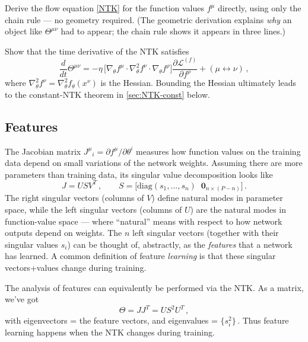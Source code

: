 \documentclass[11pt]{article}
\newcommand{\CL}{{\mathcal L}}
\newcommand{\pd}{\partial}
\begin{document}
\begin{exercise}
\label{ex:ntk-direct}
Derive the flow equation \eqref{NTK} for the function values $f^\mu$ directly, using only the chain rule --- no geometry required. (The geometric derivation explains \emph{why} an object like $\Theta^{\mu\nu}$ had to appear; the chain rule shows it appears in three lines.)
\end{exercise}

\begin{exercise}
\label{ex:ntk-dot}
Show that the time derivative of the NTK satisfies
%
\begin{equation}
    \frac{d}{dt} \Theta^{\mu\nu} = -\eta\,\big[ \nabla_\theta f^\mu \cdot \nabla_\theta^2 f^\nu \cdot \nabla_\theta f^\rho\big] \frac{\partial \CL^{(f)}}{\partial f^\rho} + (\mu\leftrightarrow\nu)\,,
\end{equation}
%
where $\nabla_\theta^2 f^\nu = \nabla_\theta^2 f_\theta(x^\nu)$ is the Hessian.
Bounding the Hessian ultimately leads to the constant-NTK theorem in \cref{sec:NTK-const} below.
\end{exercise}

\subsection{Features}
\label{sec:features}

The Jacobian matrix $J^\mu{}_i=\pd f^\mu/\pd \theta^i$ measures how function values on the training data depend on small variations of the network weights. Assuming there are more parameters than training data, its singular value decomposition looks like
%
\begin{equation} J = USV^T\,,\qquad S = \bigg[\text{diag}(s_1,...,s_n)\;\; \mathbf 0_{n\times (P-n)}\bigg]\,. \end{equation}
%
The right singular vectors (columns of $V$) define natural modes in parameter space, while the left singular vectors (columns of $U$) are the natural modes in function-value space --- where ``natural'' means with respect to how network outputs depend on weights.  The $n$ left singular vectors (together with their singular values $s_i$) can be thought of, abstractly, as the \emph{features} that a network has learned. A common definition of feature \emph{learning} is that these singular vectors+values change during training.

The analysis of features can equivalently be performed via the NTK. As a matrix, we've got
%
\begin{equation}
    \Theta = JJ^T = US^2U^T\,, \label{NTK-diag}
\end{equation}
%
with eigenvectors = the feature vectors, and eigenvalues = $\{s_i^2\}$\,. Thus feature learning happens when the NTK changes during training.
\end{document}
